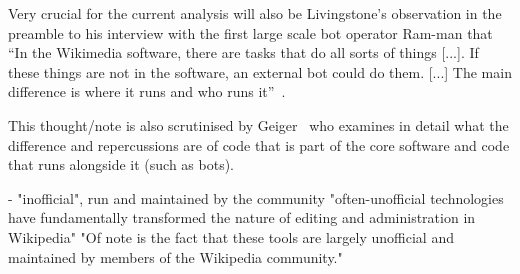 Very crucial for the current analysis will also be Livingstone's observation in the preamble to his interview with the first large scale bot operator Ram-man that
``In the Wikimedia software, there are tasks that do all sorts of things [...].
If these things are not in the software, an external bot could do them. [...]
The main difference is where it runs and who runs it''~\cite{Livingstone2016}.

This thought/note is also scrutinised by Geiger~\cite{Geiger2014} who examines in detail what the difference and repercussions are of code that is part of the core software and code that runs alongside it (such as bots). %

- "inofficial", run and maintained by the community
    \cite{GeiRib2010}
    "often-unofficial technologies have fundamentally
    transformed the nature of editing and administration in
    Wikipedia"
    "Of note is the fact that these tools are largely
    unofficial and maintained by members of the Wikipedia
    community."

\begin{comment}
"ClueBot\_NG uses state-of-the-art machine learning techniques to review all contributions to

ClueBot NG:
\cite{GeiHal2013}
"to scan every edit made to Wikipedia in real time"
"Built on Bayesian neural networks and trained with data
about what kind of edits Wikipedians regularly revert as
vandalism"
articles and to revert vandalism,"~\cite{HalRied2012}

"XLinkBot reverts contributions that create links to
blacklisted domains as a way of quickly and permanently dealing with spammers."~\cite{HalRied2012}

"AIV Helperbot turns a simple page into a dynamic
priority-based discussion queue to support administrators in their work of identifying and
blocking vandals"~\cite{HalRied2012}


~\cite{HalRied2012}
"The first tools to redefine the
way Wikipedia dealt with van-
dalism were AntiVandalBot and
VandalProof."

"AntiVandalBot used a simple set
of rules and heuristics to monitor
changes made to articles, identify the
most obvious cases of vandalism, and
automatically revert them"

1st vandalism fighting bot:
"this bot made it possible, for the first
time, for the Wikipedia community
to protect the encyclopedia from
damage without wasting the time
and energy of good-faith editors"
"it
wasn’t very intelligent and could only
correct the most egregious instances
of vandalism."


Bots not patrolling constantly but instead doing batch cleanup works~\cite{GeiHal2013}:
AWB, DumbBOT, EmausBot
(also from figures: VolkovBot, WikitanvirBot, Xqbot)

\cite{GeiRib2010}
"“HBC AIV helperbot7” – automatically
removed the third vandal fighter's now-obsolete report."

\end{comment}

